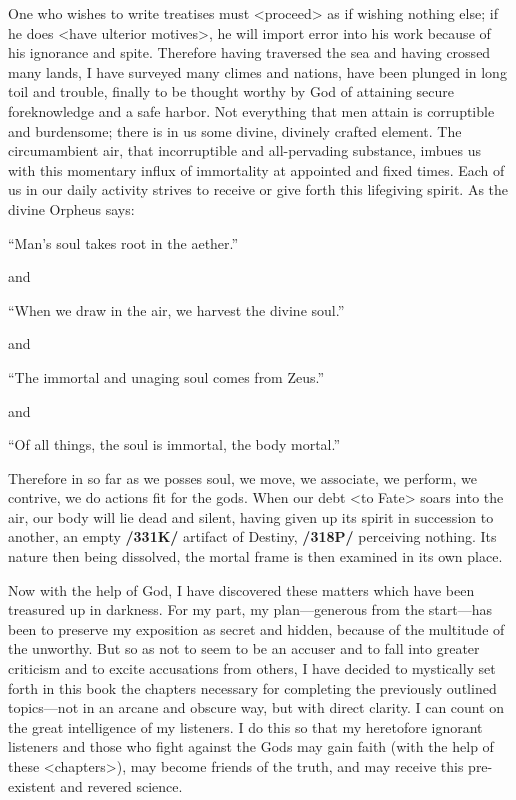 One who wishes to write treatises must <proceed> as if wishing nothing else; if he does <have ulterior motives>, he will import error into his work because of his ignorance and spite. Therefore having traversed the sea and having crossed many lands, I have surveyed many climes and nations, have been plunged in long toil and trouble, finally to be thought worthy by God of attaining secure foreknowledge and a safe harbor. Not everything that men attain is corruptible and burdensome; there is in us some divine, divinely crafted element. The circumambient air, that incorruptible and all-pervading substance, imbues us with this momentary influx of immortality at appointed and fixed times. Each of us in our daily activity strives to receive or give forth this lifegiving spirit. As the divine Orpheus says:

“Man’s soul takes root in the aether.”

\noindent and

“When we draw in the air, we harvest the divine soul.”

\noindent and

“The immortal and unaging soul comes from Zeus.”

\noindent and

“Of all things, the soul is immortal, the body mortal.”

Therefore in so far as we posses soul, we move, we associate, we perform, we contrive, we do actions fit for the gods. When our debt <to Fate> soars into the air, our body will lie dead and silent, having given up its spirit in succession to another, an empty \textbf{/331K/} artifact of Destiny, \textbf{/318P/} perceiving nothing. Its nature then being dissolved, the mortal frame is then examined in its own place.

Now with the help of God, I have discovered these matters which have been treasured up in darkness. For my part, my plan—generous from the start—has been to preserve my exposition as secret and hidden,
because of the multitude of the unworthy. But so as not to seem to be an accuser and to fall into greater criticism and to excite accusations from others, I have decided to mystically set forth in this book the
chapters necessary for completing the previously outlined topics—not in an arcane and obscure way, but with direct clarity. I can count on the great intelligence of my listeners. I do this so that my heretofore
ignorant listeners and those who fight against the Gods may gain faith (with the help of these <chapters>), may become friends of the truth, and may receive this pre-existent and revered science.
\newpage